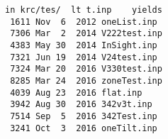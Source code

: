 \documentclass{article}
\begin{document}
\begin{verbatim}
in krc/tes/  lt t.inp    yields
 1611 Nov  6  2012 oneList.inp
 7306 Mar  2  2014 V222test.inp
 4383 May 30  2014 InSight.inp
 7321 Jun 19  2014 V24test.inp
 7324 Mar 20  2016 V330test.inp
 8285 Mar 24  2016 zoneTest.inp
 4039 Aug 23  2016 flat.inp
 3942 Aug 30  2016 342v3t.inp
 7514 Sep  5  2016 342Test.inp
 3241 Oct  3  2016 oneTilt.inp
\end{verbatim}  
\end{document}
